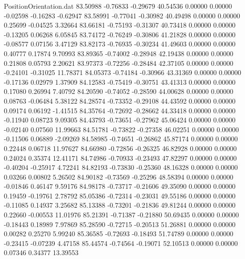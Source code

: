 \begin{filecontents}{PositionOrientation.dat}
  83.50988   -0.76833   -0.29679    40.54536    0.00000    0.00000   -0.02598   -0.16283   -0.62947
  83.58991   -0.77041   -0.30982    40.49498    0.00000    0.00000    0.25699   -0.04525    3.32664
  83.66181   -0.75193   -0.31307    40.73418    0.00000    0.00000   -0.13205    0.06268    6.05845
  83.74172   -0.76249   -0.30806    41.21828    0.00000    0.00000   -0.08577    0.07156    3.47129
  83.82173   -0.76935   -0.30234    41.49603    0.00000    0.00000    0.40777    0.17874    9.70993
  83.89365   -0.74002   -0.28948    42.19438    0.00000    0.00000    0.21808    0.05793    2.20621
  83.97373   -0.72256   -0.28484    42.37105    0.00000    0.00000   -0.24101   -0.31025   11.78371
  84.05373   -0.74184   -0.30966    43.31369    0.00000    0.00000   -0.17136    0.02979    1.37909
  84.12583   -0.75419   -0.30751    43.41313    0.00000    0.00000    0.17080    0.26994    7.40792
  84.20590   -0.74052   -0.28590    44.00628    0.00000    0.00000    0.08763   -0.06484    5.38122
  84.28574   -0.73352   -0.29108    44.43592    0.00000    0.00000    0.09174    0.06192   -1.41515
  84.35764   -0.72692   -0.28662    44.33418    0.00000    0.00000   -0.11940    0.08723    9.09305
  84.43793   -0.73651   -0.27962    45.06424    0.00000    0.00000   -0.02140    0.07560   11.99663
  84.51781   -0.73822   -0.27358    46.02251    0.00000    0.00000   -0.11506    0.06889   -2.09269
  84.58985   -0.74651   -0.26862    45.87174    0.00000    0.00000    0.22448    0.06718   11.97627
  84.66980   -0.72856   -0.26325    46.82928    0.00000    0.00000    0.24024    0.35374   12.41171
  84.74986   -0.70933   -0.23493    47.82297    0.00000    0.00000   -0.40204   -0.25917    4.72241
  84.82193   -0.73830   -0.25360    48.16328    0.00000    0.00000    0.03266    0.00802    5.26502
  84.90182   -0.73569   -0.25296    48.58394    0.00000    0.00000   -0.01846    0.46147    9.59176
  84.98178   -0.73717   -0.21606    49.35090    0.00000    0.00000    0.19459   -0.19761    2.78792
  85.05386   -0.72314   -0.23031    49.55186    0.00000    0.00000   -0.11085    0.14937    3.25682
  85.13388   -0.73201   -0.21836    49.81244    0.00000    0.00000    0.22660   -0.00553   11.01976
  85.21391   -0.71387   -0.21880    50.69435    0.00000    0.00000   -0.18443    0.18989    7.97869
  85.28590   -0.72715   -0.20513    51.26881    0.00000    0.00000    0.00282    0.25270    5.99240
  85.36585   -0.72693   -0.18493    51.74789    0.00000    0.00000   -0.23415   -0.07239    4.47158
  85.44574   -0.74564   -0.19071    52.10513    0.00000    0.00000    0.07346    0.34377   13.39553

\end{filecontents}
